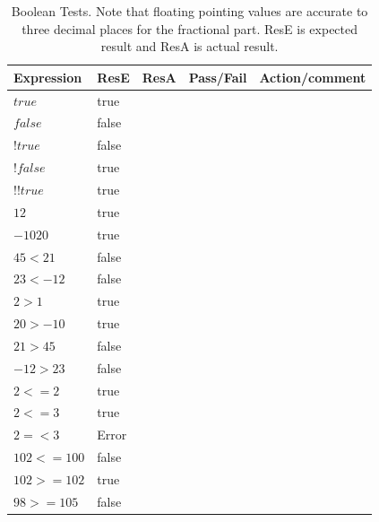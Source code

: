 \documentclass[a4paper, oneside, 11pt]{report}
\begin{document}
\begin{table}
\centering
\caption{Boolean Tests. Note that floating pointing values are accurate to three decimal places for the fractional part. ResE is expected result and ResA is actual result. \\}
\label{Table5}
\begin{tabular}{|l|l|l|l|l|} 
\hline
Expression       & ResE  & ResA & Pass/Fail & Action/comment  \\ 
\hline \hline
$true$           & true  &      &           &                 \\ 
\hline
$false$          & false &      &           &                 \\ 
\hline
$!true$          & false &      &           &                 \\ 
\hline
$!false$         & true  &      &           &                 \\ 
\hline
$ !!true $     & true  &      &           &                 \\ 
\hline
$12$           & true  &      &           &                 \\ 
\hline
$ -1020 $      & true  &      &           &                 \\ 
\hline
$45<21$          & false &      &           &                 \\ 
\hline
$23 < -12$       & false &      &           &                 \\ 
\hline
$2>1$            & true  &      &           &                 \\ 
\hline
$20>-10$         & true  &      &           &                 \\ 
\hline
$21>45$          & false &      &           &                 \\ 
\hline
$-12>23$         & false &      &           &                 \\ 
\hline
$2<=2$           & true  &      &           &                 \\ 
\hline
$2<=3$           & true  &      &           &                 \\ 
\hline
$2=<3$           & Error &      &           &                 \\ 
\hline
$102 <= 100$     & false &      &           &                 \\ 
\hline
$102 >= 102$     & true  &      &           &                 \\ 
\hline
$98 >= 105$      & false &      &           &                 \\ 

\end{tabular}
\end{table}
\end{document}

